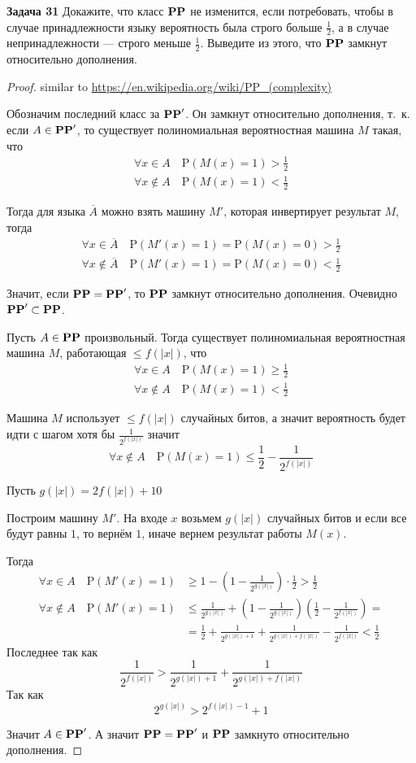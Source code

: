 \textbf{Задача 31} Докажите, что класс $\textbf{PP}$ не изменится, если потребовать, чтобы в случае принадлежности языку вероятность была строго больше $\frac{1}{2}$, а в случае непринадлежности --- строго меньше $\frac{1}{2}$. Выведите из этого, что $\textbf{PP}$ замкнут относительно дополнения.

\begin{proof}

similar to \href{https://en.wikipedia.org/wiki/PP_(complexity)#Proof_that_PP_is_closed_under_complement}{https://en.wikipedia.org/wiki/PP\_(complexity)}

Обозначим последний класс за $\textbf{PP}'$. Он замкнут относительно дополнения, т.~к. если $A\in\textbf{PP}'$, то существует полиномиальная вероятностная машина $M$ такая, что
\begin{align*}
	\forall x\in A\quad \mathrm{P}(M(x)=1)>\frac{1}{2}\\
	\forall x\not\in A\quad \mathrm{P}(M(x)=1)<\frac{1}{2}
\end{align*}


Тогда для языка $\overline A$ можно взять машину $M'$, которая инвертирует результат $M$, тогда
\begin{align*}
\forall x\in \overline A\quad \mathrm{P}(M'(x)=1)=\mathrm{P}(M(x)=0)>\frac{1}{2}\\
\forall x\not\in \overline A\quad \mathrm{P}(M'(x)=1)= \mathrm{P}(M(x)=0)<\frac{1}{2}
\end{align*}

Значит, если $\textbf{PP}=\textbf{PP}'$, то $\textbf{PP}$ замкнут относительно дополнения.
Очевидно $\textbf{PP}'\subset\textbf{PP}$.

Пусть $A\in\textbf{PP}$ произвольный. Тогда существует полиномиальная вероятностная машина $M$, работающая $\le f(|x|)$, что
\begin{align*}
\forall x\in A\quad \mathrm{P}(M(x)=1)\ge\frac{1}{2}\\
\forall x\not\in A\quad \mathrm{P}(M(x)=1)<\frac{1}{2}
\end{align*}

Машина $M$ использует $\le f(|x|)$ случайных битов, а значит вероятность будет идти с шагом хотя бы $\frac{1}{2^{f(|x|)}}$ значит
\[\forall x\not\in A\quad \mathrm{P}(M(x)=1)\le\frac{1}{2} - \frac{1}{2^{f(|x|)}}\]

Пусть $g(|x|) = 2f(|x|) + 10$

Построим машину $M'$. На входе $x$ возьмем $g(|x|)$ случайных битов и если все будут равны $1$, то вернём $1$, иначе вернем результат работы $M(x)$.

Тогда
\begin{align*}
\forall x\in A\quad \mathrm{P}(M'(x)=1)&\ge 1-\left(1-\frac{1}{2^{g(|x|)}}\right)\cdot\frac{1}{2}>\frac{1}{2}\\
\forall x\not\in A\quad \mathrm{P}(M'(x)=1)&\le\frac{1}{2^{g(|x|)}}+\left(1-\frac{1}{2^{g(|x|)}}\right)\left(\frac{1}{2}-\frac{1}{2^{f(|x|)}}\right)=\\
&=\frac{1}{2} + \frac{1}{2^{g(|x|) + 1}} + \frac{1}{2^{g(|x|) + f(|x|)}} - \frac{1}{2^{f(|x|)}} < \frac{1}{2}
\end{align*}
Последнее так как
\[\frac{1}{2^{f(|x|)}} > \frac{1}{2^{g(|x|) + 1}} + \frac{1}{2^{g(|x|) + f(|x|)}}\]
Так как
\[2^{g(|x|)}>2^{f(|x|)-1} + 1\]

Значит $A\in\textbf{PP}'$. А значит $\textbf{PP}=\textbf{PP}'$ и $\textbf{PP}$ замкнуто относительно дополнения. \end{proof}